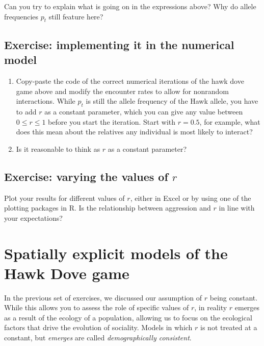 \documentclass[
]{book}
\begin{document}
Can you try to explain what is going on in the expressions above? Why do allele frequencies \(p_{t}\) still feature here?

\hypertarget{exercise-implementing-it-in-the-numerical-model}{%
\section{Exercise: implementing it in the numerical model}\label{exercise-implementing-it-in-the-numerical-model}}

\begin{enumerate}
\def\labelenumi{\arabic{enumi}.}
\item
  Copy-paste the code of the correct numerical iterations of the hawk dove game above and modify the encounter rates to allow for nonrandom interactions. While \(p_{t}\) is still the allele frequency of the Hawk allele, you have to add \(r\) as a constant parameter, which you can give any value between \(0 \leq r \leq 1\) before you start the iteration. Start with \(r=0.5\), for example, what does this mean about the relatives any individual is most likely to interact?
\item
  Is it reasonable to think as \(r\) as a constant parameter?
\end{enumerate}

\hypertarget{exercise-varying-the-values-of-r}{%
\section{\texorpdfstring{Exercise: varying the values of \(r\)}{Exercise: varying the values of r}}\label{exercise-varying-the-values-of-r}}

Plot your results for different values of \(r\), either in Excel or by using one of the plotting packages in R. Is the relationship between aggression and \(r\) in line with your expectations?

\hypertarget{spatially-explicit-models-of-the-hawk-dove-game}{%
\chapter{Spatially explicit models of the Hawk Dove game}\label{spatially-explicit-models-of-the-hawk-dove-game}}

In the previous set of exercises, we discussed our assumption of \(r\) being constant. While this allows you to assess the role of specific values of \(r\), in reality \(r\) emerges as a result of the ecology of a population, allowing us to focus on the ecological factors that drive the evolution of sociality. Models in which \(r\) is not treated at a constant, but \emph{emerges} are called \emph{demographically consistent}.
\end{document}
